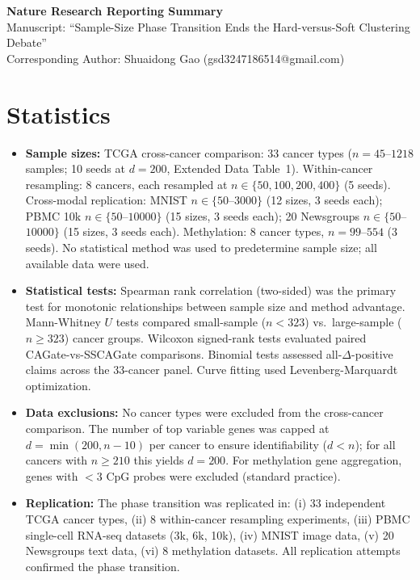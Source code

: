 \documentclass[12pt]{article}
\begin{document}
\begin{center}
{\Large\textbf{Nature Research Reporting Summary}}\\[0.5cm]
{\large Manuscript: ``Sample-Size Phase Transition Ends the Hard-versus-Soft Clustering Debate''}\\[0.3cm]
Corresponding Author: Shuaidong Gao (gsd3247186514@gmail.com)
\end{center}

\vspace{0.5cm}

\section*{Statistics}

\begin{itemize}
\item \textbf{Sample sizes:} TCGA cross-cancer comparison: 33 cancer types ($n = 45$--$1218$ samples; 10 seeds at $d=200$, Extended Data Table~1). Within-cancer resampling: 8 cancers, each resampled at $n \in \{50, 100, 200, 400\}$ (5 seeds). Cross-modal replication: MNIST $n \in \{50$--$3000\}$ (12 sizes, 3 seeds each); PBMC 10k $n \in \{50$--$10000\}$ (15 sizes, 3 seeds each); 20 Newsgroups $n \in \{50$--$10000\}$ (15 sizes, 3 seeds each). Methylation: 8 cancer types, $n = 99$--$554$ (3 seeds). No statistical method was used to predetermine sample size; all available data were used.

\item \textbf{Statistical tests:} Spearman rank correlation (two-sided) was the primary test for monotonic relationships between sample size and method advantage. Mann-Whitney $U$ tests compared small-sample ($n < 323$) vs.\ large-sample ($n \geq 323$) cancer groups. Wilcoxon signed-rank tests evaluated paired CAGate-vs-SSCAGate comparisons. Binomial tests assessed all-$\Delta$-positive claims across the 33-cancer panel. Curve fitting used Levenberg-Marquardt optimization.

\item \textbf{Data exclusions:} No cancer types were excluded from the cross-cancer comparison. The number of top variable genes was capped at $d = \min(200, n-10)$ per cancer to ensure identifiability ($d < n$); for all cancers with $n \geq 210$ this yields $d=200$. For methylation gene aggregation, genes with $<3$ CpG probes were excluded (standard practice).

\item \textbf{Replication:} The phase transition was replicated in: (i) 33 independent TCGA cancer types, (ii) 8 within-cancer resampling experiments, (iii) PBMC single-cell RNA-seq datasets (3k, 6k, 10k), (iv) MNIST image data, (v) 20 Newsgroups text data, (vi) 8 methylation datasets. All replication attempts confirmed the phase transition.


\end{itemize}
\end{document}
